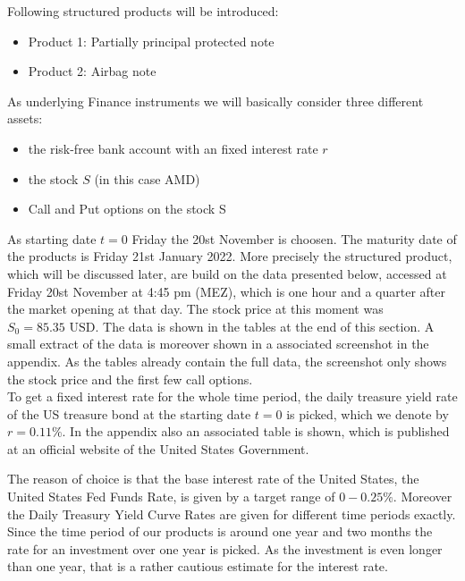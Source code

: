 \documentclass[11pt,oneside,a4paper]{article}
\begin{document}
	Following structured products will be introduced:
	\begin{itemize}
		\item Product 1: Partially principal protected note
		\item Product 2: Airbag note
	\end{itemize}
	As underlying Finance instruments we will basically consider three different assets:
	\begin{itemize}
		\item the risk-free bank account with an fixed interest rate $r$
		\item the stock $ S $ (in this case AMD)
		\item Call and Put options on the stock S
	\end{itemize}
	As starting date $ t=0 $ Friday the 20st November is choosen.
	The maturity date of the products is Friday 21st January 2022.
	More precisely the structured product, which will be discussed later, are build on the data presented below, accessed at Friday 20st November at 4:45 pm (MEZ), which is one hour and a quarter after the market opening at that day. The stock price at this moment was $ S_0=85.35 \text{ USD} $. The data is shown in the tables at the end of this section. A small extract of the data is moreover shown in a associated screenshot in the appendix. As the tables already contain the full data, the screenshot only shows the stock price and the first few call options.  \\


	To get a fixed interest rate for the whole time period, the daily treasure yield rate of the US treasure bond at the starting date $ t=0 $ is picked, which we denote by $ r = 0.11 \% $.
	In the appendix also an associated table is shown, which is published at \cite{site_treasure}
    an official website of the United States Government.
   
	
	
	The reason of choice is that the base interest rate of the United States, the United States Fed Funds Rate, is given by a target range of $ 0-0.25 \% $. Moreover the Daily Treasury Yield Curve Rates are given for different time periods exactly. Since the time period of our products is around one year and two months the rate for an investment over one year is picked. As the investment is even longer than one year, that is a rather cautious estimate for the interest rate.
	
\end{document}
